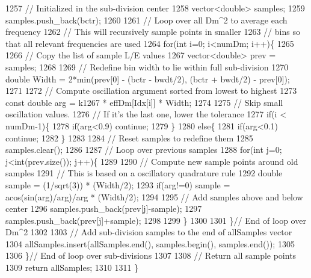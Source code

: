 \begin{DoxyCode}
1257     \textcolor{comment}{// Initialized in the sub-division center}
1258     vector<double> samples;
1259     samples.push\_back(bctr);
1260 
1261     \textcolor{comment}{// Loop over all Dm^2 to average each frequency}
1262     \textcolor{comment}{// This will recursively sample points in smaller}
1263     \textcolor{comment}{// bins so that all relevant frequencies are used}
1264     \textcolor{keywordflow}{for}(\textcolor{keywordtype}{int} i=0; i<numDm; i++)\{
1265 
1266       \textcolor{comment}{// Copy the list of sample L/E values}
1267       vector<double> prev = samples;
1268 
1269       \textcolor{comment}{// Redefine bin width to lie within full sub-division}
1270       \textcolor{keywordtype}{double} Width = 2*min(prev[0] - (bctr - bwdt/2), (bctr + bwdt/2) - prev[0]);
1271 
1272       \textcolor{comment}{// Compute oscillation argument sorted from lowest  to highest}
1273       \textcolor{keyword}{const} \textcolor{keywordtype}{double} arg = k1267 * effDm[Idx[i]] * Width;
1274 
1275       \textcolor{comment}{// Skip small oscillation values.}
1276       \textcolor{comment}{// If it's the last one, lower the tolerance}
1277       \textcolor{keywordflow}{if}(i < numDm-1)\{
1278         \textcolor{keywordflow}{if}(arg<0.9) \textcolor{keywordflow}{continue};
1279       \}
1280       \textcolor{keywordflow}{else}\{
1281         \textcolor{keywordflow}{if}(arg<0.1) \textcolor{keywordflow}{continue};
1282       \}
1283 
1284       \textcolor{comment}{// Reset samples to redefine them}
1285       samples.clear();
1286 
1287       \textcolor{comment}{// Loop over previous samples}
1288       \textcolor{keywordflow}{for}(\textcolor{keywordtype}{int} j=0; j<int(prev.size()); j++)\{
1289 
1290         \textcolor{comment}{// Compute new sample points around old samples}
1291         \textcolor{comment}{// This is based on a oscillatory quadrature rule}
1292         \textcolor{keywordtype}{double} sample = (1/sqrt(3)) * (Width/2);
1293         \textcolor{keywordflow}{if}(arg!=0) sample = acos(sin(arg)/arg)/arg * (Width/2);
1294 
1295         \textcolor{comment}{// Add samples above and below center}
1296         samples.push\_back(prev[j]-sample);
1297         samples.push\_back(prev[j]+sample);
1298 
1299       \}
1300 
1301     \}\textcolor{comment}{// End of loop over Dm^2}
1302 
1303     \textcolor{comment}{// Add sub-division samples to the end of allSamples vector}
1304     allSamples.insert(allSamples.end(), samples.begin(), samples.end());
1305 
1306   \}\textcolor{comment}{// End of loop over sub-divisions}
1307 
1308   \textcolor{comment}{// Return all sample points}
1309   \textcolor{keywordflow}{return} allSamples;
1310 
1311 \}
\end{DoxyCode}
\mbox{\label{classOscProb_1_1PMNS__Base_adf23b569112f9f9e0e592f01d79a5f3d}} 
